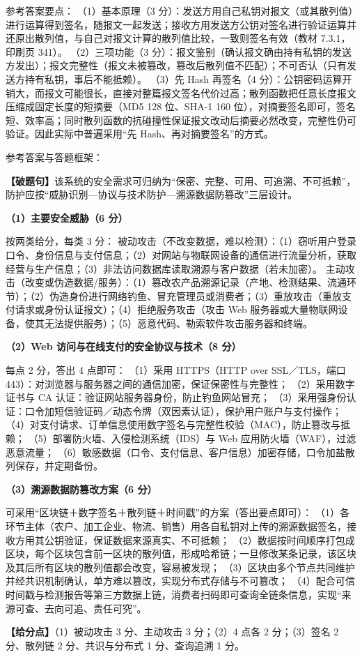 \documentclass[a4paper,11pt]{article}
\begin{document}
\q 参考答案要点：
（1）基本原理（3 分）：发送方用自己私钥对报文（或其散列值）进行运算得到签名，随报文一起发送；接收方用发送方公钥对签名进行验证运算并还原出散列值，与自己对报文计算的散列值比较，一致则签名有效（教材 7.3.1，印刷页 341）。
（2）三项功能（3 分）：报文鉴别（确认报文确由持有私钥的发送方发出）；报文完整性（报文未被篡改，篡改后散列值不匹配）；不可否认（只有发送方持有私钥，事后不能抵赖）。
（3）先 Hash 再签名（4 分）：公钥密码运算开销大，而报文可能很长，直接对整篇报文签名代价过高；散列函数把任意长度报文压缩成固定长度的短摘要（MD5 128 位、SHA-1 160 位），对摘要签名即可，签名短、效率高；同时散列函数的抗碰撞性保证报文改动后摘要必然改变，完整性仍可验证。因此实际中普遍采用“先 Hash、再对摘要签名”的方式。


\q 参考答案与答题框架：

\textbf{【破题句】}该系统的安全需求可归纳为“保密、完整、可用、可追溯、不可抵赖”，防护应按“威胁识别—协议与技术防护—溯源数据防篡改”三层设计。

\textbf{（1）主要安全威胁（6 分）}
\begin{analysis}
按两类给分，每类 3 分：
被动攻击（不改变数据，难以检测）：（1）窃听用户登录口令、身份信息与支付信息；（2）对网站与物联网设备的通信进行流量分析，获取经营与生产信息；（3）非法访问数据库读取溯源与客户数据（若未加密）。
主动攻击（改变或伪造数据/服务）：（1）篡改农产品溯源记录（产地、检测结果、流通环节）；（2）伪造身份进行网络钓鱼、冒充管理员或消费者；（3）重放攻击（重放支付请求或身份认证报文）；（4）拒绝服务攻击（攻击 Web 服务器或大量物联网设备，使其无法提供服务）；（5）恶意代码、勒索软件攻击服务器和终端。
\end{analysis}

\textbf{（2）Web 访问与在线支付的安全协议与技术（8 分）}
\begin{analysis}
每点 2 分，答出 4 点即可：
（1）采用 HTTPS（HTTP over SSL／TLS，端口 443）：对浏览器与服务器之间的通信加密，保证保密性与完整性；
（2）采用数字证书与 CA 认证：验证网站服务器身份，防止钓鱼网站冒充；
（3）采用强身份认证：口令加短信验证码／动态令牌（双因素认证），保护用户账户与支付操作；
（4）对支付请求、订单信息使用数字签名与完整性校验（MAC），防止篡改与抵赖；
（5）部署防火墙、入侵检测系统（IDS）与 Web 应用防火墙（WAF），过滤恶意流量；
（6）敏感数据（口令、支付信息、客户信息）加密存储，口令加盐散列保存，并定期备份。
\end{analysis}

\textbf{（3）溯源数据防篡改方案（6 分）}
\begin{analysis}
可采用“区块链＋数字签名＋散列链＋时间戳”的方案（答出要点即可）：
（1）各环节主体（农户、加工企业、物流、销售）用各自私钥对上传的溯源数据签名，接收方用其公钥验证，保证数据来源真实、不可抵赖；
（2）数据按时间顺序打包成区块，每个区块包含前一区块的散列值，形成哈希链；一旦修改某条记录，该区块及其后所有区块的散列值都会改变，容易被发现；
（3）区块由多个节点共同维护并经共识机制确认，单方难以篡改，实现分布式存储与不可篡改；
（4）配合可信时间戳与检测报告等第三方数据上链，消费者扫码即可查询全链条信息，实现“来源可查、去向可追、责任可究”。
\end{analysis}

\textbf{【给分点】}（1）被动攻击 3 分、主动攻击 3 分；（2）4 点各 2 分；（3）签名 2 分、散列链 2 分、共识与分布式 1 分、查询追溯 1 分。
\end{document}
